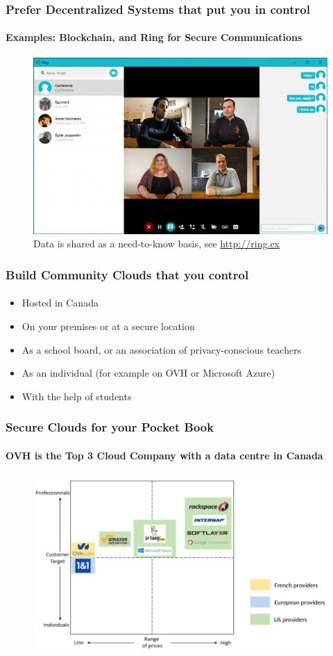 	\begin{frame}
	\frametitle{Prefer Decentralized Systems that put you in control}
	\framesubtitle{Examples: Blockchain, and Ring for Secure Communications}
	        \begin{figure}[h]
                \centering
                \includegraphics[width=.8\textwidth]{../pics/ring_interface_desktop}
		\caption{Data is shared as a need-to-know basis, see \url{http://ring.cx}}
        	\end{figure}
	\end{frame}

	\begin{frame}
	\frametitle{Build Community Clouds that you control}
	\framesubtitle{}
		\begin{itemize}[<+->]
			\item Hosted in Canada
			\item On your premises or at a secure location
			\item As a school board, or an association of privacy-conscious teachers
			\item As an individual (for example on OVH or Microsoft Azure)
			\item With the help of students 
		\end{itemize}
	\end{frame}

	\begin{frame}
	\frametitle{Secure Clouds for your Pocket Book}
	\framesubtitle{OVH is the Top 3 Cloud Company with a data centre in Canada}
	        \begin{figure}[h]
                \centering
                \includegraphics[width=.8\textwidth]{../pics/OVH-cloud-magic-quadrant}
        	\end{figure}
	\end{frame}


